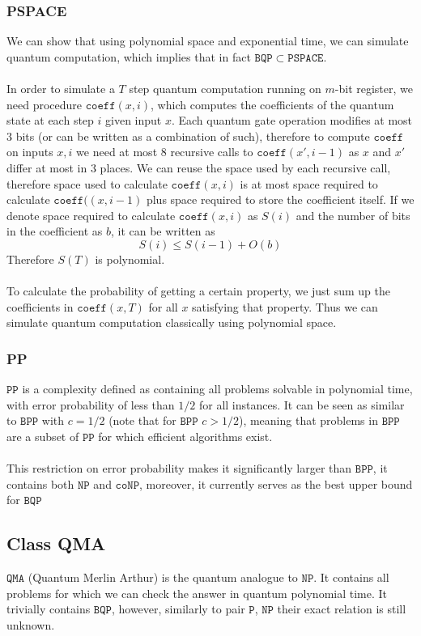 \subsubsection{PSPACE}
We can show that using polynomial space and exponential time, we can simulate quantum computation, which implies that in fact $\mathtt{BQP} \subset \mathtt{PSPACE}$. \\\\
In order to simulate a $T$ step quantum computation running on $m$-bit register, we need procedure $\mathtt{coeff}(x,i)$, which computes the coefficients of the quantum state at each step $i$ given input $x$. Each quantum gate operation modifies at most 3 bits (or can be written as a combination of such), therefore to compute $\mathtt{coeff}$ on inputs $x,i$ we need at most 8 recursive calls to $\mathtt{coeff}(x', i-1)$ as $x$ and $x'$ differ at most in 3 places. We can reuse the space used by each recursive call, therefore space used to calculate $\mathtt{coeff}(x,i)$ is at most space required to calculate $\mathtt{coeff}((x,i-1)$ plus space required to store the coefficient itself. If we denote space required to calculate $\mathtt{coeff}(x,i)$ as $S(i)$ and the number of bits in the coefficient as $b$, it can be written as 
$$S(i)\leq S(i-1)+O(b)$$
Therefore $S(T)$ is polynomial. \\\\
To calculate the probability of getting a certain property, we just sum up the coefficients in $\mathtt{coeff}(x,T)$ for all $x$ satisfying that property. Thus we can simulate quantum computation classically using polynomial space.
\subsubsection{PP}
$\mathtt{PP}$ is a complexity defined as containing all problems solvable in polynomial time, with error probability of less than $1/2$ for all instances. It can be seen as similar to $\mathtt{BPP}$ with $c=1/2$ (note that for $\mathtt{BPP}$ $c>1/2$), meaning that problems in $\mathtt{BPP}$ are a subset of $\mathtt{PP}$ for which efficient algorithms exist.\\\\
This restriction on error probability makes it significantly larger than $\mathtt{BPP}$, it contains both $\mathtt{NP}$ and $\mathtt{coNP}$, moreover, it currently serves as the best upper bound for $\mathtt{BQP}$\cite{pp_bqp} 
\subsection{Class QMA}
$\mathtt{QMA}$ (Quantum Merlin Arthur) is the quantum analogue to $\mathtt{NP}$. It contains all problems for which we can check the answer in quantum polynomial time. It trivially contains $\mathtt{BQP}$, however, similarly to pair $\mathtt{P}$, $\mathtt{NP}$ their exact relation is still unknown.
